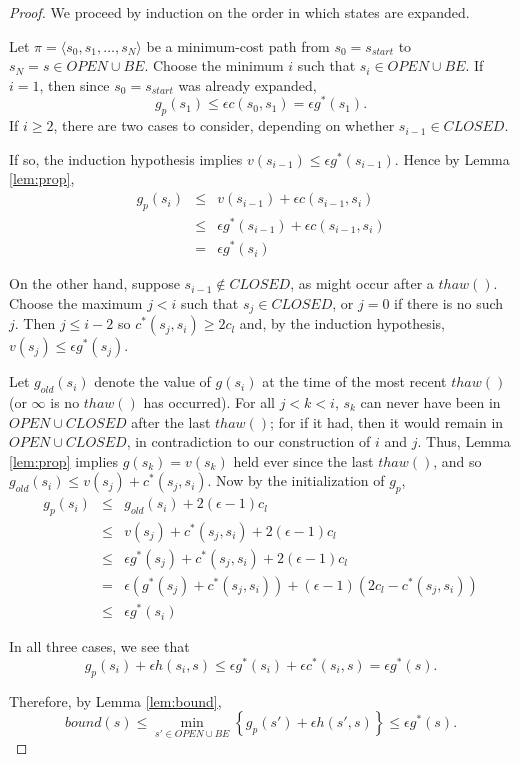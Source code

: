\documentclass[letterpaper]{article}
\begin{document}
\begin{proof}
We proceed by induction on the order in which states are expanded.

Let $\pi = \langle s_0,s_1,\ldots,s_N \rangle$ be a minimum-cost path from $s_0 = s_{start}$ to $s_N = s\in OPEN\cup BE$. Choose the minimum $i$ such that $s_i\in OPEN\cup BE$. If $i = 1$, then since $s_0 = s_{start}$ was already expanded,
\[g_p(s_1) \le \epsilon c(s_0,s_1) = \epsilon g^*(s_1).\]
If $i \ge 2$, there are two cases to consider, depending on whether $s_{i-1}\in CLOSED$.

If so, the induction hypothesis implies $v(s_{i-1}) \le \epsilon g^*(s_{i-1})$. Hence by Lemma \ref{lem:prop},
\begin{eqnarray*}
g_p(s_i) &\le& v(s_{i-1}) + \epsilon c(s_{i-1},s_i)
\\&\le& \epsilon g^*(s_{i-1}) + \epsilon c(s_{i-1},s_i)
\\&=& \epsilon g^*(s_i)
\end{eqnarray*}

On the other hand, suppose $s_{i-1}\notin CLOSED$, as might occur after a $thaw()$. Choose the maximum $j<i$ such that $s_j\in CLOSED$, or $j=0$ if there is no such $j$. Then $j\le i-2$ so $c^*(s_j,s_i)\ge 2c_l$ and, by the induction hypothesis, $v(s_j)\le \epsilon g^*(s_j)$.

Let $g_{old}(s_i)$ denote the value of $g(s_i)$ at the time of the most recent $thaw()$ (or $\infty$ is no $thaw()$ has occurred). For all $j < k < i$, $s_k$ can never have been in $OPEN\cup CLOSED$ after the last $thaw()$; for if it had, then it would remain in $OPEN\cup CLOSED$, in contradiction to our construction of $i$ and $j$. Thus, Lemma \ref{lem:prop} implies $g(s_k) = v(s_k)$ held ever since the last $thaw()$, and so $g_{old}(s_i) \le v(s_j) + c^*(s_j,s_i)$. Now by the initialization of $g_p$,
\begin{eqnarray*}
g_p(s_i) &\le& g_{old}(s_i) + 2(\epsilon-1)c_l
\\&\le& v(s_j) + c^*(s_j,s_i) + 2(\epsilon-1)c_l
\\&\le& \epsilon g^*(s_j) + c^*(s_j,s_i) + 2(\epsilon-1)c_l
\\&=& \epsilon (g^*(s_j) + c^*(s_j,s_i)) + (\epsilon-1)(2c_l - c^*(s_j,s_i))
\\&\le& \epsilon g^*(s_i)
\end{eqnarray*}

In all three cases, we see that
\[g_p(s_i) + \epsilon h(s_i,s) \le \epsilon g^*(s_i) + \epsilon c^*(s_i,s) = \epsilon g^*(s).\]

Therefore, by Lemma \ref{lem:bound},
\[bound(s) \le \min_{s' \in OPEN \cup BE} \left\{g_p(s') + \epsilon h(s',s)\right\} \le \epsilon g^*(s).\]
\end{proof}
\end{document}
